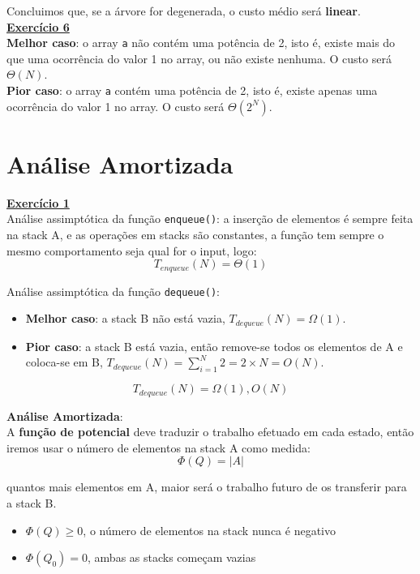 \documentclass[a4paper,11pt]{article}
\begin{document}
	\noindent Concluimos que, se a árvore for degenerada, o custo médio será \textbf{linear}.\\
	
	
	\noindent \underline{\textbf{Exercício 6}}\\
	
	\noindent \textbf{Melhor caso}: o array \texttt{a} não contém uma potência de 2, isto é, existe mais do que uma ocorrência do valor 1 no array, ou não existe nenhuma. O custo será $\Theta(N)$.\\
	
	\noindent \textbf{Pior caso}: o array \texttt{a} contém uma potência de 2, isto é, existe apenas uma ocorrência do valor 1 no array. O custo será $\Theta(2^N)$.\\
	
	
	
	\newpage
	
	\section{Análise Amortizada}
	
	
	\noindent \underline{\textbf{Exercício 1}}\\
	
	\noindent Análise assimptótica da função \texttt{enqueue()}: a inserção de elementos é sempre feita na stack A, e as operações em stacks são constantes, a função tem sempre o mesmo comportamento seja qual for o input, logo:
	\[
		T_{enqueue}(N) = \Theta(1)
	\]
	
	\noindent Análise assimptótica da função \texttt{dequeue()}:
	\begin{itemize}
		\item \textbf{Melhor caso}: a stack B não está vazia, $ T_{dequeue}(N) = \Omega(1) $.
		\item \textbf{Pior caso}: a stack B está vazia, então remove-se todos os elementos de A e coloca-se em B, $ T_{dequeue}(N) = \sum_{i=1}^{N} 2 = 2 \times N = O(N) $.
	\end{itemize}
	\[
		T_{dequeue}(N) = \Omega(1), O(N)
	\]
	
	\noindent \textbf{Análise Amortizada}:\\
	
	\noindent A \textbf{função de potencial} deve traduzir o trabalho efetuado em cada estado, então iremos usar o número de elementos na stack A como medida:
	\[
		\Phi(Q) = |A|
	\]
	
	\noindent quantos mais elementos em A, maior será o trabalho futuro de os transferir para a stack B.
	\begin{itemize}
		\item $\Phi(Q) \geq 0$, o número de elementos na stack nunca é negativo
		\item $\Phi(Q_0) = 0$, ambas as stacks começam vazias
	\end{itemize}
	
\end{document}
